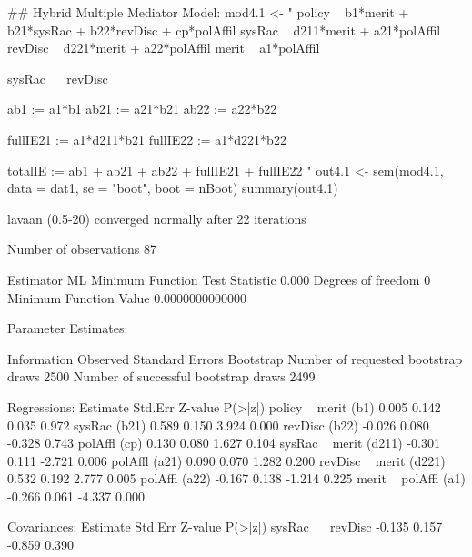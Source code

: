 \begin{Schunk}
\begin{Sinput}
 ## Hybrid Multiple Mediator Model:
 mod4.1 <- "
 policy ~ b1*merit + b21*sysRac + b22*revDisc + cp*polAffil
 sysRac ~ d211*merit + a21*polAffil
 revDisc ~ d221*merit + a22*polAffil
 merit ~ a1*polAffil
 
 sysRac ~~ revDisc
 
 ab1 := a1*b1
 ab21 := a21*b21
 ab22 := a22*b22
 
 fullIE21 := a1*d211*b21
 fullIE22 := a1*d221*b22
 
 totalIE := ab1 + ab21 + ab22 + fullIE21 + fullIE22
 "
 out4.1 <- 
     sem(mod4.1, data = dat1, se = "boot", boot = nBoot)
 summary(out4.1)
\end{Sinput}
\begin{Soutput}
lavaan (0.5-20) converged normally after  22 iterations

  Number of observations                            87

  Estimator                                         ML
  Minimum Function Test Statistic                0.000
  Degrees of freedom                                 0
  Minimum Function Value               0.0000000000000

Parameter Estimates:

  Information                                 Observed
  Standard Errors                            Bootstrap
  Number of requested bootstrap draws             2500
  Number of successful bootstrap draws            2499

Regressions:
                   Estimate  Std.Err  Z-value  P(>|z|)
  policy ~                                            
    merit     (b1)    0.005    0.142    0.035    0.972
    sysRac   (b21)    0.589    0.150    3.924    0.000
    revDisc  (b22)   -0.026    0.080   -0.328    0.743
    polAffl   (cp)    0.130    0.080    1.627    0.104
  sysRac ~                                            
    merit   (d211)   -0.301    0.111   -2.721    0.006
    polAffl  (a21)    0.090    0.070    1.282    0.200
  revDisc ~                                           
    merit   (d221)    0.532    0.192    2.777    0.005
    polAffl  (a22)   -0.167    0.138   -1.214    0.225
  merit ~                                             
    polAffl   (a1)   -0.266    0.061   -4.337    0.000

Covariances:
                   Estimate  Std.Err  Z-value  P(>|z|)
  sysRac ~~                                           
    revDisc          -0.135    0.157   -0.859    0.390


\end{Soutput}
\end{Schunk}
